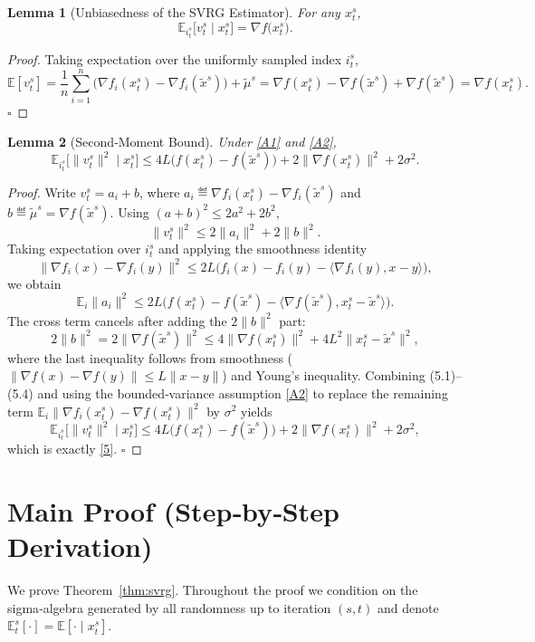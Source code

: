 \documentclass{article}
\newtheorem{lemma}{Lemma}
\begin{document}
\begin{lemma}[Unbiasedness of the SVRG Estimator]\label{lem:unbiased}
For any $x_{t}^{s}$,
\[
\mathbb{E}_{i_t^{s}}\!\big[v_{t}^{s}\mid x_{t}^{s}\big]=\nabla f\!\big(x_{t}^{s}\big).
\tag{4}
\]
\end{lemma}
\begin{proof}
Taking expectation over the uniformly sampled index $i_t^{s}$,
\[
\mathbb{E}[v_{t}^{s}]
= \frac{1}{n}\sum_{i=1}^{n}\big(\nabla f_i(x_{t}^{s})-\nabla f_i(\tilde{x}^{s})\big)+\tilde{\mu}^{s}
= \nabla f(x_{t}^{s})-\nabla f(\tilde{x}^{s})+\nabla f(\tilde{x}^{s})
= \nabla f(x_{t}^{s}).
\] \hfill $\square$
\end{proof}

\begin{lemma}[Second‑Moment Bound]\label{lem:variance}
Under \ref{A1} and \ref{A2},
\[
\mathbb{E}_{i_t^{s}}\!\big[\|v_{t}^{s}\|^{2}\mid x_{t}^{s}\big]
\le 4L\big(f(x_{t}^{s})-f(\tilde{x}^{s})\big)+2\|\nabla f(x_{t}^{s})\|^{2}+2\sigma^{2}.
\tag{5}
\]
\end{lemma}
\begin{proof}
Write $v_{t}^{s}=a_{i}+b$, where $a_{i}\eqdef\nabla f_i(x_{t}^{s})-\nabla f_i(\tilde{x}^{s})$ and $b\eqdef\tilde{\mu}^{s}=\nabla f(\tilde{x}^{s})$.
Using $(a+b)^{2}\le2a^{2}+2b^{2}$,
\[
\|v_{t}^{s}\|^{2}\le2\|a_{i}\|^{2}+2\|b\|^{2}.
\tag{5.1}
\]
Taking expectation over $i_t^{s}$ and applying the smoothness identity
\[
\|\nabla f_i(x)-\nabla f_i(y)\|^{2}
\le 2L\big(f_i(x)-f_i(y)-\langle\nabla f_i(y),x-y\rangle\big),
\tag{5.2}
\]
we obtain
\[
\mathbb{E}_{i}\|a_{i}\|^{2}
\le 2L\Big(f(x_{t}^{s})-f(\tilde{x}^{s})-\langle\nabla f(\tilde{x}^{s}),x_{t}^{s}-\tilde{x}^{s}\rangle\Big).
\tag{5.3}
\]
The cross term cancels after adding the $2\|b\|^{2}$ part:
\[
2\|b\|^{2}=2\|\nabla f(\tilde{x}^{s})\|^{2}
\le 4\|\nabla f(x_{t}^{s})\|^{2}+4L^{2}\|x_{t}^{s}-\tilde{x}^{s}\|^{2},
\tag{5.4}
\]
where the last inequality follows from smoothness ($\|\nabla f(x)-\nabla f(y)\|\le L\|x-y\|$) and Young’s inequality.
Combining (5.1)–(5.4) and using the bounded‑variance assumption \ref{A2} to replace the remaining term
$\mathbb{E}_{i}\|\nabla f_i(x_{t}^{s})-\nabla f(x_{t}^{s})\|^{2}$ by $\sigma^{2}$ yields
\[
\mathbb{E}_{i_t^{s}}\!\big[\|v_{t}^{s}\|^{2}\mid x_{t}^{s}\big]
\le 4L\big(f(x_{t}^{s})-f(\tilde{x}^{s})\big)+2\|\nabla f(x_{t}^{s})\|^{2}+2\sigma^{2},
\]
which is exactly \eqref{5}. \hfill $\square$
\end{proof}

\section*{Main Proof (Step‑by‑Step Derivation)}
We prove Theorem~\ref{thm:svrg}. Throughout the proof we condition on the sigma‑algebra generated by all randomness up to iteration $(s,t)$ and denote $\mathbb{E}_{t}^{s}[\cdot]=\mathbb{E}[\cdot\mid x_{t}^{s}]$.
\end{document}
